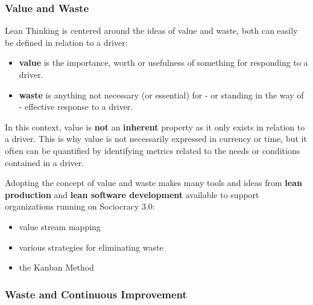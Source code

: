 \subsubsection{Value and Waste}
\label{valueandwaste}

Lean Thinking is centered around the ideas of value and waste, both can easily be defined in relation to a driver:

\begin{itemize}
\item \textbf{value} is the importance, worth or usefulness of something for responding to a driver.

\item \textbf{waste} is anything not necessary (or essential) for - or standing in the way of - effective response to a driver.

\end{itemize}

In this context, value is \textbf{not} an \textbf{inherent} property as it only exists in relation to a driver. This is why value is not necessarily expressed in currency or time, but it often can be quantified by identifying metrics related to the needs or conditions contained in a driver.

Adopting the concept of value and waste makes many tools and ideas from \textbf{lean production} and \textbf{lean software development} available to support organizations running on Sociocracy 3.0:

\begin{itemize}
\item value stream mapping

\item various strategies for eliminating waste

\item the Kanban Method

\end{itemize}

\subsubsection{Waste and Continuous Improvement}
\label{wasteandcontinuousimprovement}

